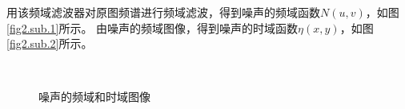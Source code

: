 \documentclass{article}
\begin{document}
用该频域滤波器对原图频谱进行频域滤波，得到噪声的频域函数$N(u,v)$，如图\ref{fig2.sub.1}所示。
由噪声的频域图像，得到噪声的时域函数$\eta(x,y)$，如图\ref{fig2.sub.2}所示。
\begin{figure}[H]
    \centering
    \,    
    \caption{噪声的频域和时域图像}  \label{fig2.main}
\end{figure}
\end{document}
